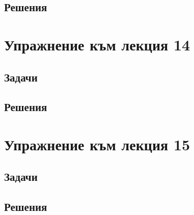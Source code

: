 \documentclass[a4paper,fleqn,12pt]{article}
\theoremstyle{definition}
\begin{document}
\subsection{Решения}

\newpage 
\section{Упражнение към лекция 14}

\subsection{Задачи}

\newpage
\subsection{Решения}

\newpage 
\section{Упражнение към лекция 15}

\subsection{Задачи}

\newpage
\subsection{Решения}
\end{document}
